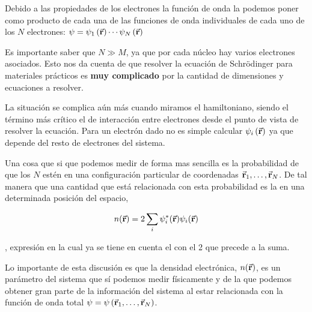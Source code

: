 Debido a las propiedades de los electrones la función de onda la podemos poner como producto de cada una de las funciones de onda individuales de cada uno de los $N$ electrones: $\psi = \psi_{1} \left( \va{r} \right) \cdots \psi_{N} \left( \va{r} \right)$ 

Es importante saber que $N \gg M$, ya que por cada núcleo hay varios electrones asociados. Esto nos da cuenta de que resolver la ecuación de Schrödinger para materiales prácticos es \textbf{muy complicado} por la cantidad de dimensiones y ecuaciones a resolver. 

La situación se complica aún más cuando miramos el hamiltoniano, siendo el término más crítico el de interacción entre electrones desde el punto de vista de resolver la ecuación. Para un electrón dado no es simple calcular $\psi_{i} \left( \va{r} \right)$ ya que depende del resto de electrones del sistema.

Una cosa que si que podemos medir de forma mas sencilla es la probabilidad de que los $N$ estén en una configuración particular de coordenadas $\va{r}_{1} , \dots , \va{r}_{N}$. De tal manera que una cantidad que está relacionada con esta probabilidad es la  en una determinada posición del espacio, 

\begin{equation}
    n(\va{r}) = 2 \sum_i \psi^*_i (\va{r}) \psi_i (\va{r})
\end{equation}

, expresión en la cual ya se tiene en cuenta el  con el 2 que precede a la suma.

Lo importante de esta discusión es que la densidad electrónica, $n(\va{r})$, es un parámetro del sistema que sí podemos medir físicamente y de la que podemos obtener gran parte de la información del sistema al estar relacionada con la función de onda total  $\psi = \psi \left( \va{r}_{1} , \dots , \va{r}_{N} \right)$.
